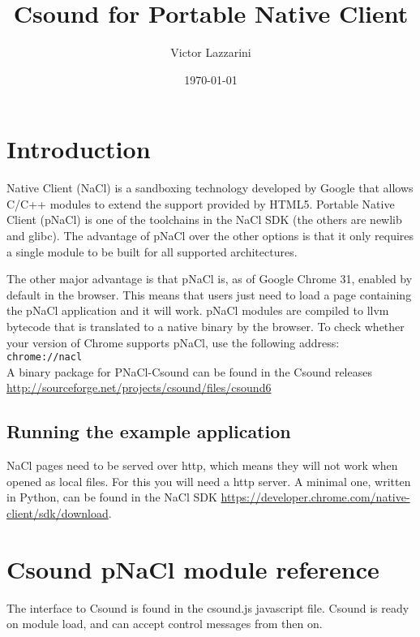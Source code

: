 \documentclass[11pt]{article}
\begin{document}
\title{Csound for Portable Native Client}
\author{Victor Lazzarini}
\date{\today}
\maketitle

\section{Introduction}

Native Client (NaCl) is a sandboxing technology developed by Google that allows C/C++ modules to extend the support provided
by HTML5. Portable Native Client (pNaCl) is one of the toolchains in the NaCl SDK (the others are newlib and glibc). The advantage
of pNaCl over the other options is that it only requires a single module to be built for all supported architectures.

The other major advantage is that pNaCl is, as of Google Chrome 31, enabled by default in the browser. This means that users
just need to load a page containing the pNaCl application and it will work. pNaCl modules are compiled to llvm bytecode that is 
translated to a native binary by the browser. To check whether your version of Chrome supports pNaCl, use the following address:
\\

 {\tt chrome://nacl }
\\

A binary package for PNaCl-Csound can be found in the Csound releases \url{http://sourceforge.net/projects/csound/files/csound6}

\subsection{Running the example application}

NaCl pages need to be served over http, which means they will not work
when opened as local files. For this you will need a http server. A
minimal one, written in Python, can be found in the NaCl SDK 
\url{https://developer.chrome.com/native-client/sdk/download}.

\section{Csound pNaCl module reference}

The interface to Csound is found in the csound.js javascript file. Csound is ready on module load, and can accept control messages
from then on.
\end{document}
